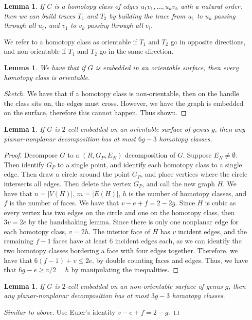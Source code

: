 \documentclass[]{article}
\newtheorem{lemma}[theorem]{Lemma}
\theoremstyle{definition}
\numberwithin{theorem}{section}
\numberwithin{equation}{section}
\begin{document}
\begin{lemma}
	If $C$ is a homotopy class of edges $u_1v_1, ..., u_kv_k$ with a natural order, then we can build traces $T_1$ and $T_2$ by building the trace from $u_1$ to $u_k$ passing through all $u_i$, and $v_1$ to $v_k$ passing through all $v_i$. 
\end{lemma}
We refer to a homotopy class as orientable if $T_1$ and $T_2$ go in opposite directions, and non-orientable if $T_1$ and $T_2$ go in the same direction.

\begin{lemma}
	We have that if $G$ is embedded in an orientable surface, then every homotopy class is orientable.
\end{lemma}
\begin{proof}[Sketch]
	We have that if a homotopy class is non-orientable, then on the handle the class sits on, the edges must cross. However, we have the graph is embedded on the surface, therefore this cannot happen. Thus shown. 
\end{proof}

\begin{lemma}
	If $G$ is $2$-cell embedded on an orientable surface of genus $g$, then any planar-nonplanar decomposition has at most $6g-3$ homotopy classes. 
\end{lemma}
\begin{proof}
	Decompose $G$ to a $(R, G_P, E_N)$ decomposition of $G$. Suppose $E_N \neq \emptyset$. Then identify $G_P$ to a single point, and identify each homotopy class to a single edge. Then draw a circle around the point $G_P$, and place vertices where the circle intersects all edges. Then delete the vertex $G_P$, and call the new graph $H$. We have that $n = |V(H)|$, $m = |E(H)|$, $h$ is the number of homotopy classes, and $f$ is the number of faces. We have that $v - e + f = 2 - 2g$. Since $H$ is cubic as every vertex has two edges on the circle and one on the homotopy class, then $3v = 2e$ by the handshaking lemma. Since there is only one nonplanar edge for each homotopy class, $v = 2h$. The interior face of $H$ has $v$ incident edges, and the remaining $f-1$ faces have at least 6 incident edges each, as we can identify the two homotopy classes bordering a face with four edges together. Therefore, we have that $6(f-1) + v \leq 2e$, by double counting faces and edges. Thus, we have that $6g - e \geq v/2 = h$ by manipulating the inequalities. 
\end{proof}

\begin{lemma}
	If $G$ is $2$-cell embedded on an non-orientable surface of genus $g$, then any planar-nonplanar decomposition has at most $3g-3$ homotopy classes. 
\end{lemma}
\begin{proof}[Similar to above]
	Use Euler's identity $v - e + f = 2-g$. 
\end{proof}
\end{document}
